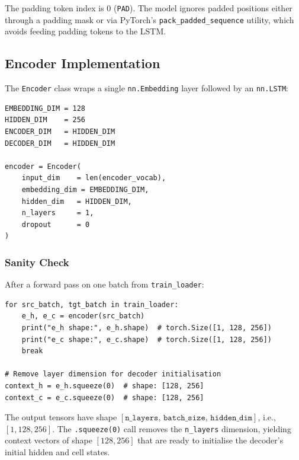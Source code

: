 \documentclass[12pt,a4paper]{article}
\begin{document}
The padding token index is 0 (\texttt{PAD}).  The model ignores padded
positions either through a padding mask or via PyTorch's
\texttt{pack\_padded\_sequence} utility, which avoids feeding padding tokens
to the LSTM.

\subsection{Encoder Implementation}
\label{subsec:encoder_impl}

The \texttt{Encoder} class wraps a single \texttt{nn.Embedding} layer followed
by an \texttt{nn.LSTM}:

\begin{codebox}[title=Encoder Hyperparameters and Instantiation (V05)]
\begin{verbatim}
EMBEDDING_DIM = 128
HIDDEN_DIM    = 256
ENCODER_DIM   = HIDDEN_DIM
DECODER_DIM   = HIDDEN_DIM

encoder = Encoder(
    input_dim    = len(encoder_vocab),
    embedding_dim = EMBEDDING_DIM,
    hidden_dim   = HIDDEN_DIM,
    n_layers     = 1,
    dropout      = 0
)
\end{verbatim}
\end{codebox}

\subsubsection*{Sanity Check}

After a forward pass on one batch from \texttt{train\_loader}:

\begin{codebox}[title=Encoder Sanity Check]
\begin{verbatim}
for src_batch, tgt_batch in train_loader:
    e_h, e_c = encoder(src_batch)
    print("e_h shape:", e_h.shape)  # torch.Size([1, 128, 256])
    print("e_c shape:", e_c.shape)  # torch.Size([1, 128, 256])
    break

# Remove layer dimension for decoder initialisation
context_h = e_h.squeeze(0)  # shape: [128, 256]
context_c = e_c.squeeze(0)  # shape: [128, 256]
\end{verbatim}
\end{codebox}

The output tensors have shape $[\texttt{n\_layers},\,\texttt{batch\_size},\,
\texttt{hidden\_dim}]$, i.e., $[1, 128, 256]$.  The \texttt{.squeeze(0)} call
removes the \texttt{n\_layers} dimension, yielding context vectors of shape
$[128, 256]$ that are ready to initialise the decoder's initial hidden and cell
states.
\end{document}
